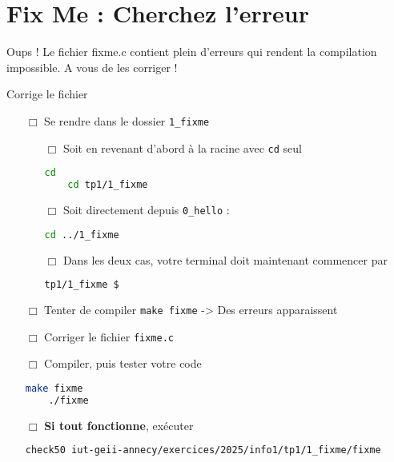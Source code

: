 \section{Fix Me : Cherchez l'erreur}

Oups ! Le fichier fixme.c contient plein d'erreurs qui rendent la compilation impossible.
A vous de les corriger !


\begin{UPSTIManipulation}{Corrige le fichier}
	\begin{itemize}
		\item[$\Box$] Se rendre dans le dossier \texttt{1\_fixme}
		      \begin{itemize}
			      \item[$\Box$] Soit en revenant d'abord à la racine avec \texttt{cd} seul
			            \begin{lstlisting}[language=bash,style=console]
	cd
	cd tp1/1_fixme
\end{lstlisting}
			      \item[$\Box$] Soit directement depuis \texttt{0\_hello} :
			            \begin{lstlisting}[language=bash,style=console]
	cd ../1_fixme
\end{lstlisting}
			      \item[$\Box$] Dans les deux cas, votre terminal doit maintenant commencer par
			            \begin{lstlisting}[language=bash,style=console]
	tp1/1_fixme $
\end{lstlisting}
		      \end{itemize}
		\item[$\Box$] Tenter de compiler \texttt{make fixme} -> Des erreurs apparaissent
		\item[$\Box$] Corriger le fichier \texttt{fixme.c}
		\item[$\Box$] Compiler, puis tester votre code
		      \begin{lstlisting}[language=bash,style=console]
	make fixme
	./fixme
\end{lstlisting}
		\item[$\Box$] \textbf{Si tout fonctionne}, exécuter
		      \begin{lstlisting}[language=bash,style=console]
check50 iut-geii-annecy/exercices/2025/info1/tp1/1_fixme/fixme
\end{lstlisting}
	\end{itemize}
\end{UPSTIManipulation}